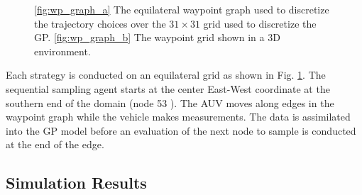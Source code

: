 \documentclass[aoas]{imsart}
\begin{document}
\begin{figure}[!h] 
\centering 
{}
\hfill
{}
\caption{\ref{fig:wp_graph_a} The equilateral waypoint graph used to discretize the
trajectory choices over the $31\times31$ grid used to discretize the GP.
\ref{fig:wp_graph_b} The waypoint grid shown in a 3D environment.}
\label{fig:wp_graph}
\end{figure}

Each strategy is conducted on an equilateral grid as shown in
Fig. \ref{fig:wp_graph}. The sequential sampling agent starts at the
center East-West coordinate at the southern end of the domain (node 53
). The
AUV moves along edges in the waypoint graph while the vehicle makes
measurements. The data is assimilated into the GP model before an
evaluation of the next node to sample is conducted at the end of the
edge.

\subsection{Simulation Results}
\end{document}
